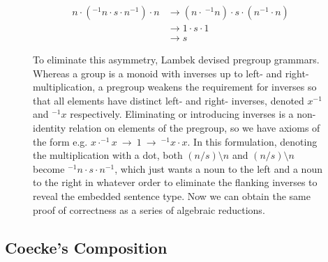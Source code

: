 \begin{figure}[h!]
\centering
{}
\caption{To eliminate this asymmetry, Lambek devised pregroup grammars. Whereas a group is a monoid with inverses up to left- and right-multiplication, a pregroup weakens the requirement for inverses so that all elements have distinct left- and right- inverses, denoted $x^{-1}$ and $^{-1}x$ respectively. Eliminating or introducing inverses is a non-identity relation on elements of the pregroup, so we have axioms of the form e.g. $x \cdot ^{-1}x \ \rightarrow \ 1 \ \rightarrow \ ^{-1}x \cdot x$. In this formulation, denoting the multiplication with a dot, both $(n/s)\setminus n$ and $(n/s)\setminus n$ become $^{-1}n \cdot s \cdot n^{-1}$, which just wants a noun to the left and a noun to the right in whatever order to eliminate the flanking inverses to reveal the embedded sentence type. Now we can obtain the same proof of correctness as a series of algebraic reductions.}

\[
\begin{align}
n \cdot (^{-1}n \cdot s \cdot n^{-1}) \cdot n &\rightarrow (n \cdot \ ^{-1}n) \cdot s \cdot (n^{-1} \cdot n) \\
&\rightarrow 1 \cdot s \cdot 1 \\
&\rightarrow s
\end{align}
\]
\end{figure}
\clearpage

\subsection{Coecke's Composition}

